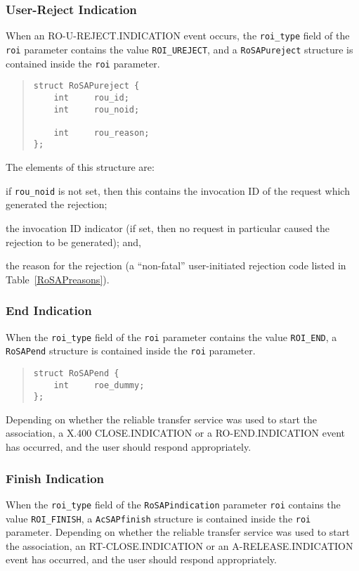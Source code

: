 \subsubsection  {User-Reject Indication}\label{rejections}
When an {\sf RO-U-REJECT.INDICATION\/} event occurs,
the \verb"roi_type" field of the \verb"roi" parameter contains the value
\verb"ROI_UREJECT",
and a \verb"RoSAPureject" structure is contained inside the \verb"roi"
parameter.
\begin{quote}\small\begin{verbatim}
struct RoSAPureject {
    int     rou_id;
    int     rou_noid;

    int     rou_reason;
};
\end{verbatim}\end{quote}
The elements of this structure are:
\begin{describe}
\item[\verb"rou\_id":] if \verb"rou_noid" is not set,
then this contains the invocation ID of the request which generated the
rejection;

\item[\verb"rou\_noid":] the invocation ID indicator
(if set, then no request in particular caused the rejection to be generated);
and,

\item[\verb"rou\_reason":] the reason for the rejection
(a ``non-fatal'' user-initiated rejection code listed in
Table~\ref{RoSAPreasons}).
\end{describe}

\subsubsection  {End Indication}\label{ros:end}
When the \verb"roi_type" field of the \verb"roi" parameter contains the value
\verb"ROI_END",
a \verb"RoSAPend" structure is contained inside the \verb"roi"
parameter.
\begin{quote}\small\begin{verbatim}
struct RoSAPend {
    int     roe_dummy;
};
\end{verbatim}\end{quote}
Depending on whether the reliable transfer service was used to start the
association,
a {\sf X.400 CLOSE.INDICATION\/} or a {\sf RO-END.INDICATION\/} event has
occurred,
and the user should respond appropriately.

\subsubsection	{Finish Indication}\label{ros:finish}
When the \verb"roi_type" field of the \verb"RoSAPindication" parameter
\verb"roi" contains the value
\verb"ROI_FINISH",
a \verb"AcSAPfinish" structure is contained inside the \verb"roi" parameter.
Depending on whether the reliable transfer service was used to start the
association,
an {\sf RT-CLOSE.INDICATION\/} or an {\sf A-RELEASE.INDICATION\/} event has
occurred, and the user should respond appropriately.

